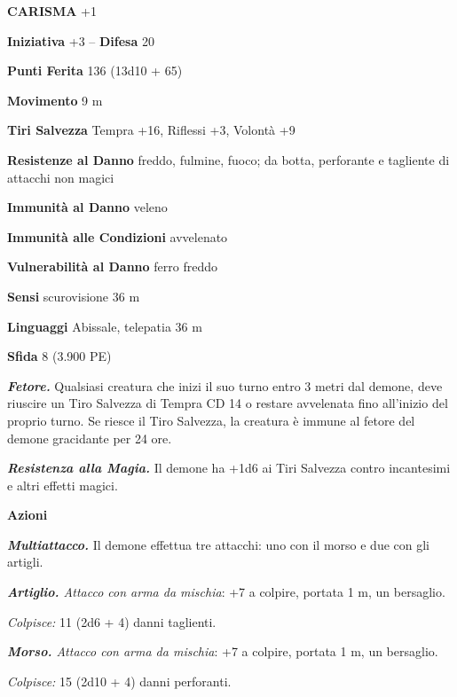 \begin{multicols}{2}
\textbf{CARISMA} +1

\textbf{Iniziativa} +3 -- \textbf{Difesa} 20

\textbf{Punti Ferita} 136 (13d10 + 65)

\textbf{Movimento} 9 m

\textbf{Tiri Salvezza} Tempra +16, Riflessi +3, Volontà +9

\textbf{Resistenze al Danno} freddo, fulmine, fuoco; da botta, perforante e tagliente di attacchi non magici

\textbf{Immunità al Danno} veleno

\textbf{Immunità alle Condizioni} avvelenato

\textbf{Vulnerabilità al Danno} ferro freddo

\textbf{Sensi} scurovisione 36 m

\textbf{Linguaggi} Abissale, telepatia 36 m 

\textbf{Sfida} 8 (3.900 PE)

\emph{\textbf{Fetore.}} Qualsiasi creatura che inizi il suo turno entro 3 metri dal demone, deve riuscire un Tiro Salvezza di Tempra CD 14 o restare avvelenata fino all'inizio del proprio turno. Se riesce il Tiro Salvezza, la creatura è immune al fetore del demone gracidante per 24 ore.

\emph{\textbf{Resistenza alla Magia.}} Il demone ha +1d6 ai Tiri Salvezza contro incantesimi e altri effetti magici.

\textbf{Azioni}

\emph{\textbf{Multiattacco.}} Il demone effettua tre attacchi: uno con il morso e due con gli artigli.

\emph{\textbf{Artiglio.} Attacco con arma da mischia}: +7 a colpire, portata 1 m, un bersaglio.

\emph{Colpisce:} 11 (2d6 + 4) danni taglienti.

\emph{\textbf{Morso.} Attacco con arma da mischia}: +7 a colpire, portata 1 m, un bersaglio.

\emph{Colpisce:} 15 (2d10 + 4) danni perforanti.


\end{multicols}

